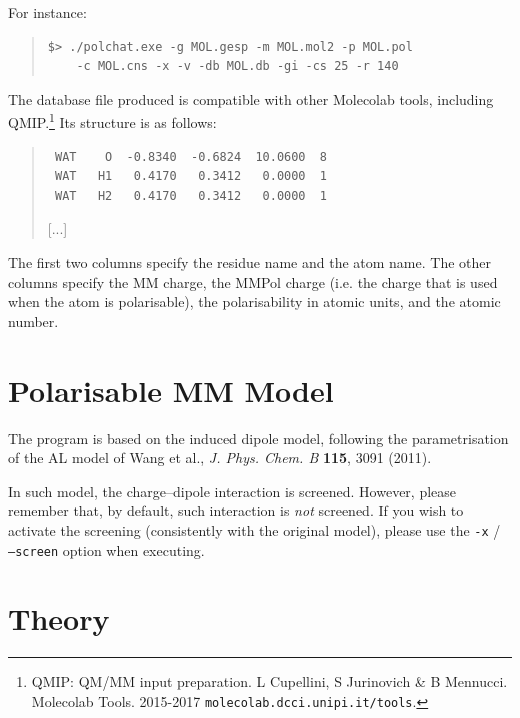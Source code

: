 \documentclass[a4paper]{report}
\begin{document}
For instance:
\begin{framed}
\begin{quote}
\begin{verbatim}
$> ./polchat.exe -g MOL.gesp -m MOL.mol2 -p MOL.pol 
    -c MOL.cns -x -v -db MOL.db -gi -cs 25 -r 140
\end{verbatim}
\end{quote}
\end{framed}

The database file produced is compatible with other Molecolab tools, including QMIP.\footnote{QMIP: QM/MM input preparation. L Cupellini, S Jurinovich \& B Mennucci. Molecolab Tools. 2015-2017 \texttt{molecolab.dcci.unipi.it/tools}.} Its structure is as follows:
\begin{framed}
\begin{quote}
\begin{verbatim}
 WAT    O  -0.8340  -0.6824  10.0600  8
 WAT   H1   0.4170   0.3412   0.0000  1
 WAT   H2   0.4170   0.3412   0.0000  1
\end{verbatim}
[...]
\end{quote}
\end{framed}

The first two columns specify the residue name and the atom name. The other columns specify the MM charge, the MMPol charge (i.e. the charge that is used when the atom is polarisable), the polarisability in atomic units, and the atomic number.

\section*{Polarisable MM Model}

The program is based on the induced dipole model, following the parametrisation of the AL model of Wang et al., \emph{J. Phys. Chem. B} \textbf{115}, 3091 (2011).

In such model, the charge--dipole interaction is screened. However, please remember that, by default, such interaction is \emph{not} screened. If you wish to activate the screening (consistently with the original model), please use the \texttt{-x} / \texttt{--screen} option when executing.

\section*{Theory}
\end{document}
